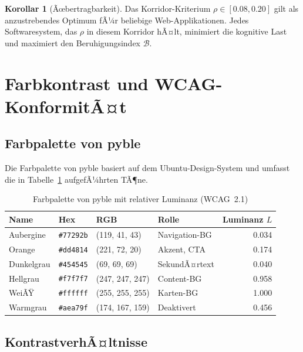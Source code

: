 ﻿\documentclass[a4paper,12pt]{article}
\theoremstyle{definition}
\newtheorem{korollar}{Korollar}
\begin{document}
\begin{korollar}[Ãœbertragbarkeit]
\label{kor:uebertragbarkeit}
    Das Korridor-Kriterium $\rho \in [0.08, 0.20]$ gilt als anzustrebendes
    Optimum fÃ¼r beliebige Web-Applikationen. Jedes Softwaresystem, das $\rho$
    in diesem Korridor hÃ¤lt, minimiert die kognitive Last und maximiert den
    Beruhigungsindex $\mathcal{B}$.
\end{korollar}

\section{Farbkontrast und WCAG-KonformitÃ¤t}
\label{sec:kontrast}

\subsection{Farbpalette von pyble}

Die Farbpalette von pyble basiert auf dem Ubuntu-Design-System und umfasst
die in Tabelle~\ref{tab:farben} aufgefÃ¼hrten TÃ¶ne.

\begin{table}[h]
\centering
\caption{Farbpalette von pyble mit relativer Luminanz (WCAG~2.1)}
\label{tab:farben}
\begin{tabular}{llllr}
\toprule
\textbf{Name} & \textbf{Hex} & \textbf{RGB} & \textbf{Rolle} & \textbf{Luminanz $L$} \\
\midrule
Aubergine   & \texttt{\#77292b} & (119, 41, 43)   & Navigation-BG    & 0.034 \\
Orange      & \texttt{\#dd4814} & (221, 72, 20)   & Akzent, CTA       & 0.174 \\
Dunkelgrau  & \texttt{\#454545} & (69, 69, 69)    & SekundÃ¤rtext      & 0.040 \\
Hellgrau    & \texttt{\#f7f7f7} & (247, 247, 247) & Content-BG       & 0.958 \\
WeiÃŸ        & \texttt{\#ffffff} & (255, 255, 255) & Karten-BG        & 1.000 \\
Warmgrau    & \texttt{\#aea79f} & (174, 167, 159) & Deaktivert        & 0.456 \\
\bottomrule
\end{tabular}
\end{table}

\subsection{KontrastverhÃ¤ltnisse}
\end{document}

